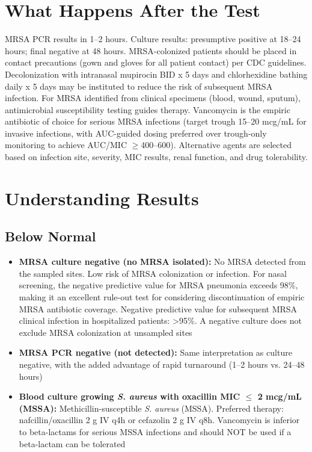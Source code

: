 \section*{What Happens After the Test}
MRSA PCR results in 1--2 hours. Culture results: presumptive positive at 18--24 hours; final negative at 48 hours. MRSA-colonized patients should be placed in contact precautions (gown and gloves for all patient contact) per CDC guidelines. Decolonization with intranasal mupirocin BID x 5 days and chlorhexidine bathing daily x 5 days may be instituted to reduce the risk of subsequent MRSA infection. For MRSA identified from clinical specimens (blood, wound, sputum), antimicrobial susceptibility testing guides therapy. Vancomycin is the empiric antibiotic of choice for serious MRSA infections (target trough 15--20 mcg/mL for invasive infections, with AUC-guided dosing preferred over trough-only monitoring to achieve AUC/MIC $\geq$400--600). Alternative agents are selected based on infection site, severity, MIC results, renal function, and drug tolerability.

\section*{Understanding Results}

\subsection*{Below Normal}
\begin{itemize}
  \item \textbf{MRSA culture negative (no MRSA isolated):} No MRSA detected from the sampled sites. Low risk of MRSA colonization or infection. For nasal screening, the negative predictive value for MRSA pneumonia exceeds 98\%, making it an excellent rule-out test for considering discontinuation of empiric MRSA antibiotic coverage. Negative predictive value for subsequent MRSA clinical infection in hospitalized patients: >95\%. A negative culture does not exclude MRSA colonization at unsampled sites
  \item \textbf{MRSA PCR negative (not detected):} Same interpretation as culture negative, with the added advantage of rapid turnaround (1--2 hours vs. 24--48 hours)
  \item \textbf{Blood culture growing \textit{S. aureus} with oxacillin MIC $\leq$ 2 mcg/mL (MSSA):} Methicillin-susceptible \textit{S. aureus} (MSSA). Preferred therapy: nafcillin/oxacillin 2 g IV q4h or cefazolin 2 g IV q8h. Vancomycin is inferior to beta-lactams for serious MSSA infections and should NOT be used if a beta-lactam can be tolerated
\end{itemize}


